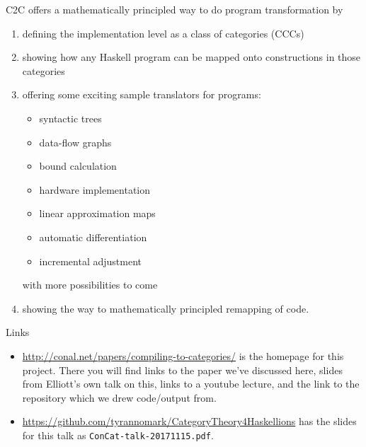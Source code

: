 \documentclass[10pt]{beamer}
\theoremstyle{definition}
\theoremstyle{remark}
\numberwithin{equation}{section}
\begin{document}
\begin{frame}[fragile]{}
  C2C offers a mathematically principled way to do program transformation by
  \begin{enumerate}
  \item defining the implementation level as a class of categories (CCCs)
  \item showing how any Haskell program can be mapped onto constructions in those categories
  \item offering some exciting sample translators for programs:
    \begin{itemize}
    \item syntactic trees
    \item data-flow graphs
    \item bound calculation
    \item hardware implementation
    \item linear approximation maps
    \item automatic differentiation
    \item incremental adjustment
    \end{itemize}
    with more possibilities to come
  \item showing the way to mathematically principled remapping of code.
  \end{enumerate}
\end{frame}

\begin{frame}[fragile]{Links}

  \begin{itemize}
  \item \url{http://conal.net/papers/compiling-to-categories/} is the homepage for this project. There you will find links to the paper we've discussed here, slides from Elliott's own talk on this, links to a youtube lecture, and the link to the repository which we drew code/output from.
  \item \url{https://github.com/tyrannomark/CategoryTheory4Haskellions} has the slides for this talk as \texttt{ConCat-talk-20171115.pdf}.
  \end{itemize}
  
  \nocite{Elliott-2017-compiling-to-categories}
  
  
\end{frame}
\end{document}
